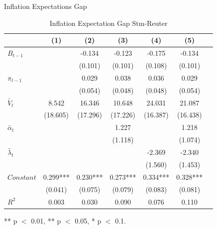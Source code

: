\documentclass[aspectratio=169,xcolor=dvipsnames]{beamer}
\begin{document}
\begin{frame}{Inflation Expectations Gap}

  \begin{table}[!ht]
  \small
\centering 
  \caption{Inflation Expectation Gap Stm-Reuter} 
  \label{tab:Inflation Expectation Gap Stm-Reuter}
\begin{tabular}{l*{6}{c}}   
\toprule
                    & (1) & (2) & (3) & (4) & (5) \\
\midrule
$B_{t-1}$           &     & -0.134 & -0.123 & -0.175 & -0.134 \\
                    &     & (0.101) & (0.101) & (0.108) & (0.101) \\
$\pi_{t-1}$         &     & 0.029 & 0.038 & 0.036 & 0.029 \\
                    &     & (0.054) & (0.048) & (0.048) & (0.054) \\
$\tilde{V_t}$       & 8.542 & 16.346 & 10.648 & 24.031 & 21.087 \\
                    & (18.605) & (17.296) & (17.226) & (16.387) & (16.438) \\
$\tilde{\alpha_t}$  &     &     & 1.227 &     & 1.218 \\
                    &     &     & (1.118) &     & (1.074) \\
$\tilde{\lambda_t}$ &     &     &     & -2.369 & -2.340 \\
                    &     &     &     & (1.560) & (1.453) \\
$Constant$          & 0.299*** & 0.230*** & 0.273*** & 0.334*** & 0.328*** \\
                    & (0.041) & (0.075) & (0.079) & (0.083) & (0.081) \\
\midrule
$R^2$               & 0.003 & 0.030 & 0.090 & 0.076 & 0.110 \\
\bottomrule
\end{tabular} 
\parbox{0.8\textwidth}{\centering \small *** p $<$ 0.01, ** p $<$ 0.05, * p $<$ 0.1.}
\end{table}

\end{frame}

\end{document}
